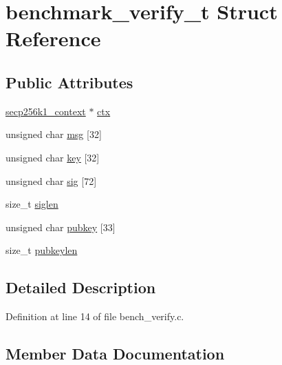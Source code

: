 \hypertarget{structbenchmark__verify__t}{}\section{benchmark\+\_\+verify\+\_\+t Struct Reference}
\label{structbenchmark__verify__t}
\subsection*{Public Attributes}
\begin{DoxyCompactItemize}
\item 
\hyperlink{secp256k1_8h_a282ec9e6dfec8c35955c3eb2f7476e5e}{secp256k1\+\_\+context} $\ast$ \hyperlink{structbenchmark__verify__t_ac4e3488929ce883255241ef451b8c9ad}{ctx}
\item 
unsigned char \hyperlink{structbenchmark__verify__t_a5941066c834af80d568078780c2d69d7}{msg} \mbox{[}32\mbox{]}
\item 
unsigned char \hyperlink{structbenchmark__verify__t_acdc2cf6f21a2aa51036585bd93fe11fc}{key} \mbox{[}32\mbox{]}
\item 
unsigned char \hyperlink{structbenchmark__verify__t_a3109a53e5491482e77df9039d3e01720}{sig} \mbox{[}72\mbox{]}
\item 
size\+\_\+t \hyperlink{structbenchmark__verify__t_a75e2235d538ab592d540c45118218843}{siglen}
\item 
unsigned char \hyperlink{structbenchmark__verify__t_af79770b187ad7a6dd6bc816682e02a8c}{pubkey} \mbox{[}33\mbox{]}
\item 
size\+\_\+t \hyperlink{structbenchmark__verify__t_a49a11cf3776db6f6df107d4632da6627}{pubkeylen}
\end{DoxyCompactItemize}


\subsection{Detailed Description}


Definition at line 14 of file bench\+\_\+verify.\+c.



\subsection{Member Data Documentation}
\hypertarget{structbenchmark__verify__t_ac4e3488929ce883255241ef451b8c9ad}{}
